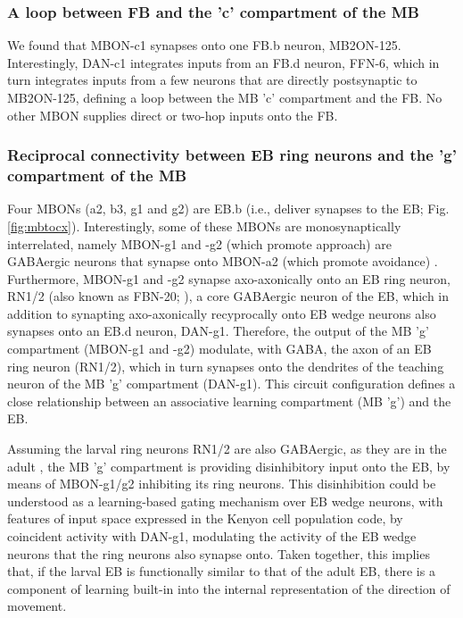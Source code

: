     \subsubsection{A loop between FB and the 'c' compartment of the MB}
    We found that MBON-c1 synapses onto one FB.b neuron, MB2ON-125.
    Interestingly, DAN-c1 integrates inputs from an FB.d neuron, FFN-6, which in turn integrates inputs from a few neurons that are directly postsynaptic to MB2ON-125, defining a loop between the MB 'c' compartment and the FB.
    No other MBON supplies direct or two-hop inputs onto the FB.

    \subsubsection{Reciprocal connectivity between EB ring neurons and the 'g' compartment of the MB}
    Four MBONs (a2, b3, g1 and g2) are EB.b (i.e., deliver synapses to the EB; Fig. \ref{fig:mbtocx}). Interestingly, some of these MBONs are monosynaptically interrelated, namely MBON-g1 and -g2 (which promote approach) are GABAergic neurons that synapse onto MBON-a2 (which promote avoidance) \citep{eschbach2021circuits}.
    Furthermore, MBON-g1 and -g2 synapse axo-axonically onto an EB ring neuron, RN1/2 (also known as FBN-20; \citep{eschbach2021circuits}), a core GABAergic neuron of the EB, which in addition to synapting axo-axonically recyprocally onto EB wedge neurons also synapses onto an EB.d neuron, DAN-g1.
    Therefore, the output of the MB 'g' compartment (MBON-g1 and -g2) modulate, with GABA, the axon of an EB ring neuron (RN1/2), which in turn synapses onto the dendrites of the teaching neuron of the MB 'g' compartment (DAN-g1).
    This circuit configuration defines a close relationship between an associative learning compartment (MB 'g') and the EB.

    Assuming the larval ring neurons RN1/2 are also GABAergic, as they are in the adult \citep{hanesch1989neuronal}, the MB 'g' compartment is providing disinhibitory input onto the EB, by means of MBON-g1/g2 inhibiting its ring neurons.
    This disinhibition could be understood as a learning-based gating mechanism over EB wedge neurons, with features of input space expressed in the Kenyon cell population code, by coincident activity with DAN-g1, modulating the activity of the EB wedge neurons that the ring neurons also synapse onto.
    Taken together, this implies that, if the larval EB is functionally similar to that of the adult EB, there is a component of learning built-in into the internal representation of the direction of movement.

